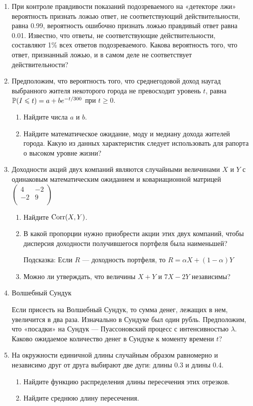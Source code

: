 \begin{enumerate}
\item При контроле правдивости показаний подозреваемого на «детекторе лжи» вероятность признать ложью ответ, не соответствующий действительности, равна 0.99, вероятность ошибочно признать ложью правдивый ответ равна 0.01. Известно, что ответы, не соответствующие действительности, составляют 1\% всех ответов подозреваемого.
Какова вероятность того, что ответ, признанный ложью, и в самом деле не соответствует действительности?
\item Предположим, что вероятность того, что среднегодовой доход наугад выбранного жителя некоторого города не превосходит уровень $t$, равна $\P(I\le t)=a+be^{-t/300}$ при $t\ge 0$.
\begin{enumerate}
\item Найдите числа $a$ и $b$.
\item Найдите математическое ожидание, моду и медиану дохода жителей города. Какую из данных характеристик следует использовать для рапорта о высоком уровне жизни?
\end{enumerate}

\item Доходности акций двух компаний являются случайными величинами $X$ и $Y$ с одинаковым математическим ожиданием и ковариационной матрицей $\left( \begin{array}{cc}
   4 & -2  \\
   -2 & 9  \\
\end{array}\right)$
\begin{enumerate}
\item Найдите $\Corr(X,Y)$.
\item В какой пропорции нужно приобрести акции этих двух компаний, чтобы дисперсия доходности получившегося портфеля была наименьшей?

Подсказка: Если $R$ — доходность портфеля, то $R=\alpha X+(1-\alpha)Y$
\item Можно ли утверждать, что величины $X+Y$ и $7X-2Y$ независимы?
\end{enumerate}

\item Волшебный Сундук

Если присесть на Волшебный Сундук, то сумма денег, лежащих в нем, увеличится в два раза. Изначально в Сундуке был один рубль. Предположим, что «посадки» на Сундук — Пуассоновский процесс с интенсивностью $\lambda$. Каково ожидаемое количество денег в Сундуке к моменту времени $t$?

\item На окружности единичной длины случайным образом равномерно и независимо друг от друга выбирают две дуги: длины 0.3 и длины 0.4.
\begin{enumerate}
\item Найдите функцию распределения длины пересечения этих отрезков.
\item Найдите среднюю длину пересечения.
\end{enumerate}
\end{enumerate}

